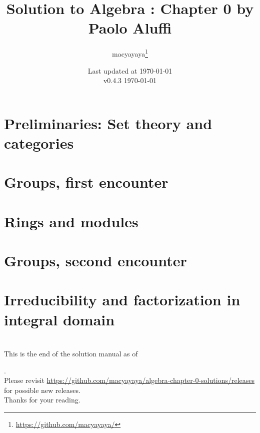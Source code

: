 \documentclass[12pt,a4paper,dvipsnames,oneside]{book}
\title{Solution to Algebra : Chapter 0 by Paolo Aluffi}
\author{macyayaya\thanks{\href{https://github.com/macyayaya/}{https://github.com/macyayaya/}}}
\date{Last updated at \today \\
v0.4.3
}
\theoremstyle{definition}
\begin{document}
\frontmatter
\maketitle

\tableofcontents
\mainmatter
\chapter{Preliminaries: Set theory and categories}

\newpage
\chapter{Groups, first encounter}

\newpage  
\chapter{Rings and modules}

\newpage
\chapter{Groups, second encounter}

\newpage
\chapter{Irreducibility and factorization in integral domain}

\newpage

\backmatter
\chapter{}
\thispagestyle{empty}
\begin{center}
\large{
This is the end of the solution manual as of \date{\today}. \\
Please revisit \href{https://github.com/macyayaya/algebra-chapter-0-solutions/releases}{https://github.com/macyayaya/algebra-chapter-0-solutions/releases} \\
for possible new releases. \\
Thanks for your reading.
}
\end{center}
\end{document}
